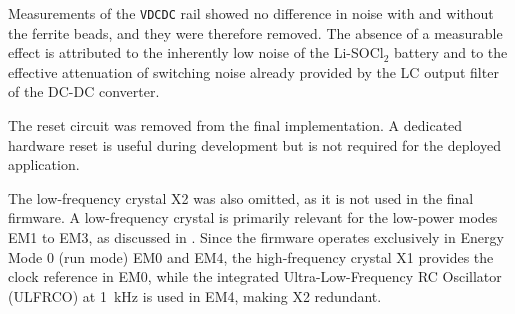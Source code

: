 Measurements of the \texttt{VDCDC} rail showed no difference in noise with and without the ferrite beads, and they were therefore removed. The absence of a measurable effect is attributed to the inherently low noise of the Li-SOCl$_2$ battery and to the effective attenuation of switching noise already provided by the LC output filter of the DC-DC converter.

The reset circuit was removed from the final implementation. A dedicated hardware reset is useful during development but is not required for the deployed application.

The low-frequency crystal X2 was also omitted, as it is not used in the final firmware. A low-frequency crystal is primarily relevant for the low-power modes EM1 to EM3, as discussed in . Since the firmware operates exclusively in Energy Mode 0 (run mode) EM0 and EM4, the high-frequency crystal X1 provides the clock reference in EM0, while the integrated Ultra-Low-Frequency RC Oscillator (ULFRCO) at \SI{1}{\kilo\hertz} is used in EM4, making X2 redundant.
 